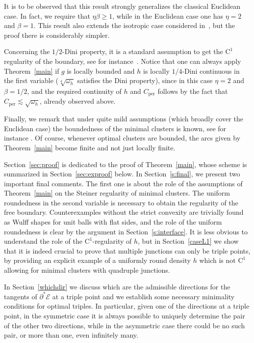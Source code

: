\documentclass[JEP,XML,SOM,Unicode,NoFloatCountersInSection]{cedram}
\newcommand\Ceeb{C_\mathrm{per}}
\theoremstyle{plain}
\theoremstyle{definition}
\begin{document}
It is to be observed that this result strongly generalizes the classical Euclidean case. In fact, we require that $\eta\beta\geq 1$, while in the Euclidean case one has $\eta=2$ and $\beta=1$. This result also extends the isotropic case considered in~\cite{FPS1}, but the proof there is considerably simpler.

Concerning the $1/2$-Dini property, it is a standard assumption to get the $\mathrm{C}^1$ regularity of the boundary, see for instance~\cite{Tam,Mag}. Notice that one can always apply Theorem~\ref{main} if $g$ is locally bounded and $h$ is locally $1/4$-Dini continuous in the first variable (\ie $\sqrt[4]{\omega_h}$ satisfies the Dini property), since in this case $\eta=2$ and $\beta=1/2$, and the required continuity of $h$ and $\Ceeb$ follows by the fact that $\Ceeb\lesssim \sqrt{\omega_h}$, already observed above.

Finally, we remark that under quite mild assumptions (which broadly cover the Euclidean case) the boundedness of the minimal clusters is known, see for instance \hbox{\cite{CP,DFP,PS18,PS19}}. Of course, whenever optimal clusters are bounded, the arcs given by Theorem~\ref{main} become finite and not just locally finite.

Section~\ref{sec:proof} is dedicated to the proof of Theorem~\ref{main}, whose scheme is summarized in Section~\ref{sec:exproof} below. In Section~\ref{s:final}, we present two important final comments. The first one is about the role of the assumptions of Theorem~\ref{main} on the Steiner regularity of minimal clusters. The uniform roundedness in the second variable is necessary to obtain the regularity of the free boundary. Counterexamples without the strict convexity are trivially found as Wulff shapes for unit balls with flat sides, and the role of the uniform roundedness is clear by the argument in Section~\ref{s:interface}. It is less obvious to understand the role of the $\mathrm{C}^1$-regularity of $h$, but in Section~\ref{caseL1} we show that it is indeed crucial to prove that multiple junctions can only be triple points, by providing an explicit example of a uniformly round density $h$ which is not $\mathrm{C}^1$ allowing for minimal clusters with quadruple junctions.

In Section~\ref{whichdir} we discuss which are the admissible directions for the tangents of $\partial^*\mathcal E$ at a triple point and we establish some necessary minimality conditions for optimal triples. In particular, given one of the directions at a triple point, in the symmetric case it is always possible to uniquely determine the pair of the other two directions, while in the asymmetric case there could be no such pair, or more than one, even infinitely many.
\end{document}
